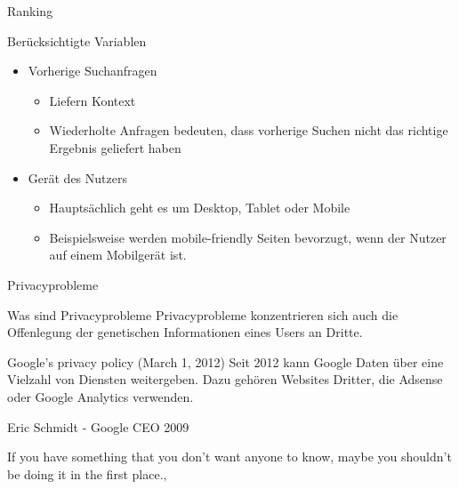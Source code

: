 \documentclass[11pt]{beamer}
\begin{document}
\begin{frame}{Ranking}    
    \begin{block}{Berücksichtigte Variablen}
        \begin{itemize}
            \item Vorherige Suchanfragen
            \begin{itemize}
                \item Liefern Kontext
                \item Wiederholte Anfragen bedeuten, dass vorherige Suchen nicht das richtige Ergebnis geliefert haben
            \end{itemize}
            \item Gerät des Nutzers
            \begin{itemize}
                \item Hauptsächlich geht es um Desktop, Tablet oder Mobile
                \item Beispielsweise werden mobile-friendly Seiten bevorzugt, wenn der Nutzer auf einem Mobilgerät ist.
            \end{itemize}
        \end{itemize}
    \end{block}
\end{frame}

\begin{frame}{Privacyprobleme}
    \begin{block}{Was sind Privacyprobleme}
            Privacyprobleme konzentrieren sich auch die Offenlegung der genetischen Informationen eines Users an Dritte.
    \end{block} 
    \begin{block}{Google's privacy policy (March 1, 2012)}
            Seit 2012 kann Google Daten über eine Vielzahl von Diensten weitergeben. Dazu gehören Websites Dritter, die Adsense oder Google Analytics verwenden. 
    \end{block}
    \begin{alertblock}{Eric Schmidt - Google CEO 2009}

    \dq If you have something that you don't want anyone to know, maybe you shouldn't be doing it in the first place.\dq‚
    \end{alertblock}
\end{frame}
\end{document}
